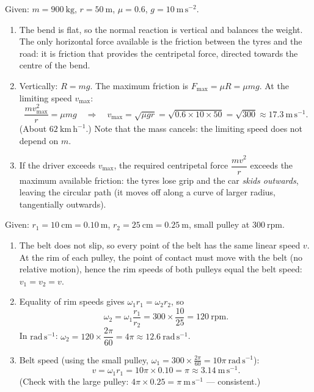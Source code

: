 \documentclass[11pt]{article}
\newcommand{\cle}[1]{{\popxbold\color{popdark}#1}}
\begin{document}
\begin{corrige}
Given: $m = 900\ \mathrm{kg}$, $r = 50\ \mathrm{m}$, $\mu = 0.6$, $g = 10\ \mathrm{m\,s^{-2}}$.
\begin{enumerate}
\item The bend is flat, so the normal reaction is vertical and balances the weight. The only horizontal force available is the \cle{friction} between the tyres and the road: it is friction that provides the centripetal force, directed towards the centre of the bend.
\item Vertically: $R = mg$. The maximum friction is $F_{\max} = \mu R = \mu mg$. At the limiting speed $v_{\max}$:
\[ \frac{mv_{\max}^{2}}{r} = \mu mg \quad\Longrightarrow\quad v_{\max} = \sqrt{\mu g r} = \sqrt{0.6\times 10\times 50} = \sqrt{300} \approx 17.3\ \mathrm{m\,s^{-1}}. \]
(About $62\ \mathrm{km\,h^{-1}}$.) Note that the mass cancels: the limiting speed does not depend on $m$.
\item If the driver exceeds $v_{\max}$, the required centripetal force $\dfrac{mv^{2}}{r}$ exceeds the maximum available friction: the tyres lose grip and the car \emph{skids outwards}, leaving the circular path (it moves off along a curve of larger radius, tangentially outwards).
\end{enumerate}
\end{corrige}

\begin{corrige}
Given: $r_{1} = 10\ \mathrm{cm} = 0.10\ \mathrm{m}$, $r_{2} = 25\ \mathrm{cm} = 0.25\ \mathrm{m}$, small pulley at $300\ \mathrm{rpm}$.
\begin{enumerate}
\item The belt does not slip, so every point of the belt has the same linear speed $v$. At the rim of each pulley, the point of contact must move with the belt (no relative motion), hence the rim speeds of both pulleys equal the belt speed: $v_{1} = v_{2} = v$.
\item Equality of rim speeds gives $\omega_{1}r_{1} = \omega_{2}r_{2}$, so
\[ \omega_{2} = \omega_{1}\frac{r_{1}}{r_{2}} = 300\times\frac{10}{25} = 120\ \mathrm{rpm}. \]
In $\mathrm{rad\,s^{-1}}$: $\omega_{2} = 120\times\dfrac{2\pi}{60} = 4\pi \approx 12.6\ \mathrm{rad\,s^{-1}}$.
\item Belt speed (using the small pulley, $\omega_{1} = 300\times\frac{2\pi}{60} = 10\pi\ \mathrm{rad\,s^{-1}}$):
\[ v = \omega_{1}r_{1} = 10\pi\times 0.10 = \pi \approx 3.14\ \mathrm{m\,s^{-1}}. \]
(Check with the large pulley: $4\pi\times 0.25 = \pi\ \mathrm{m\,s^{-1}}$ — consistent.)
\end{enumerate}
\end{corrige}
\end{document}
